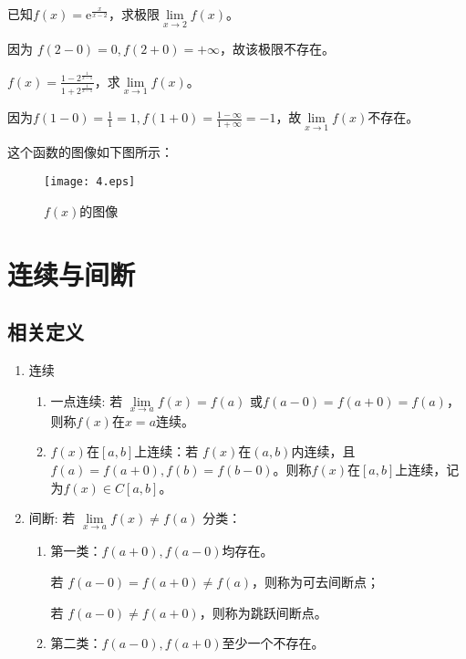         \begin{example}
            已知$ f(x)=\mathrm{e}^{\frac{x}{x-2}}$，求极限$\lim\limits_{x \to 2}f(x)$。
        \end{example}

        \begin{solution}
            因为 $f(2-0)=0 , f(2+0)=+\infty$，故该极限不存在。
        \end{solution}

        \begin{example}
            $f(x)=\displaystyle\frac{1-2^{\frac{1}{x-1}}}{1+2^{\frac{1}{x-1}}}$，求$\lim\limits_{x \to 1}f(x)$。
        \end{example}

        \begin{solution}
            因为$f(1-0)=\displaystyle\frac{1}{1}=1, f(1+0)=\displaystyle\frac{1-\infty}{1+\infty}=-1$，故$\lim\limits_{x \to 1}f(x)$不存在。
        \end{solution}
        这个函数的图像如下图所示：
        \begin{figure}[htbp]
            \centering
            \texttt{[image: 4.eps]}
            \caption{$f(x)$的图像}
          \end{figure}

          \section{连续与间断}
          \subsection{相关定义}
          \begin{enumerate}
              \item 连续
              \begin{enumerate}
                  \item 一点连续:
                  若 $\lim\limits_{x \to a}f(x)=f(a)$ 或$f(a-0)=f(a+0)=f(a)$，则称$f(x)$在$x = a$连续。
                  \item $f(x)$在$[a,b]$上连续：若 $f(x)$在$(a,b)$内连续，且$f(a)=f(a+0),f(b)=f(b-0)$。则称$f(x)$在$[a,b]$上连续，记为$f(x)\in C[a,b]$。
              \end{enumerate}
              \item 间断: 若 $\lim\limits_{x \to a}f(x)\neq f(a)$
              分类：
              \begin{enumerate}
                  \item 第一类：$f(a+0),f(a-0)$均存在。
                  
                  若 $f(a-0)=f(a+0)\neq f(a)$，则称为可去间断点；

                  若 $f(a-0)\neq f(a+0)$，则称为跳跃间断点。
                  \item 第二类：$f(a-0),f(a+0)$至少一个不存在。
              \end{enumerate}
          \end{enumerate}

